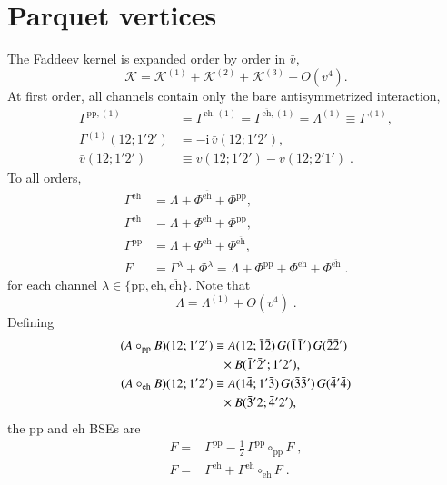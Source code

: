 \documentclass[aip,jcp,reprint,noshowkeys,superscriptaddress]{revtex4-1}
\newcommand{\cK}{\mathcal{K}}
\newcommand{\ii}{\mathrm{i}}
\newcommand{\eh}{\text{eh}}
\newcommand{\teh}{\overline{\text{eh}}}
\newcommand{\pp}{\text{pp}}
\begin{document}
\appendix

\section{Parquet vertices}
\label{app:parquet_vertices}
The Faddeev kernel is expanded order by order in 
$\bar{v}$,
\begin{equation}
\cK
=
\cK^{(1)}+\cK^{(2)}+\cK^{(3)}+O(v^4).
\label{eq:K_expansion}
\end{equation}
At first order, all channels contain only the bare antisymmetrized
interaction,
\begin{align}
\Gamma^{\pp,(1)}
&=
\Gamma^{\eh,(1)}
=
\Gamma^{\teh,(1)}
=
\Lambda^{(1)}
\equiv
\Gamma^{(1)},
\nonumber\\
\Gamma^{(1)}(12;1'2')
&=
-\ii\,\bar v(12;1'2'),
\nonumber\\
\bar v(12;1'2')
&\equiv
v(12;1'2')-v(12;2'1') \;.
\label{eq:Gamma1_bare}
\end{align}
To all orders,
\begin{align}
\Gamma^{\eh}
&=
\Lambda+\Phi^{\teh}+\Phi^{\pp},
\nonumber\\
\Gamma^{\teh}
&=
\Lambda+\Phi^{\eh}+\Phi^{\pp},
\nonumber\\
\Gamma^{\pp}
&=
\Lambda+\Phi^{\eh}+\Phi^{\teh},
\nonumber\\
F
&=
\Gamma^{\lambda}+\Phi^{\lambda}
=
\Lambda+\Phi^{\pp}+\Phi^{\eh}+\Phi^{\teh} \;.
\label{eq:parquet_channels}
\end{align}
for each channel $\lambda\in\{\pp,\eh,\teh\}$.
Note that\cite{MarieLoos2025}
\begin{equation}
\Lambda = \Lambda^{(1)}+O(v^4) \;.
\label{eq:crossing_Lambda}
\end{equation}
Defining 
\begin{align}
(A\circ_{\pp} B)(12;1'2')
&\equiv
A(12;\bar1\bar2)\,G(\bar1\bar1')\,G(\bar2\bar2')
\nonumber\\
&\hphantom{\equiv}\times
B(\bar1'\bar2';1'2'),
\label{eq:circ_def}
\\
(A\circ_{\eh}B)(12;1'2')
&\equiv
A(1\bar4;1'\bar3)\,G(\bar3\bar3')\,G(\bar4'\bar4)
\nonumber\\
&\hphantom{\equiv}\times
B(\bar3'2;\bar4'2'),
\label{eq:circ_eh_def}
\end{align}
the $\pp$ and $\eh$ BSEs are\cite{Kugler2018} 
\begin{equation}
	\begin{aligned}
F
={}&
\Gamma^{\pp}-\frac12\,\Gamma^{\pp}\circ_{\pp} F \;, \\
F
={}&
\Gamma^{\eh}+\Gamma^{\eh}\circ_{\eh}F \;.
\label{eq:parquet_BSE}
	\end{aligned}
\end{equation}
\end{document}
